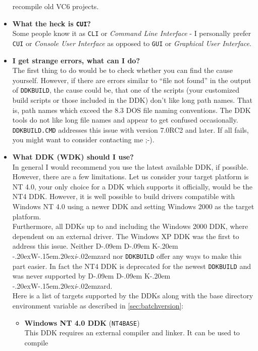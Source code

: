 \documentclass[a4paper,titlepage]{report}
\def\ddkwiz{D\kern-.09em D\kern-.09em K\kern-.20em \raise-.20ex\hbox{W}\kern-.15em\raise.20ex\hbox{\it{i}}\kern-.02em{zard}}
\begin{document}
\begin{itemize}
        recompile old VC6 projects.
  \item \textbf{What the heck is \texttt{CUI}?}\\
        Some people know it as \texttt{CLI} or \emph{Command Line Interface} - I
        personally prefer \texttt{CUI} or \emph{Console User Interface} as opposed
        to \texttt{GUI} or \emph{Graphical User Interface}.
  \item \textbf{I get strange errors, what can I do?}\\
        The first thing to do would be to check whether you can find the cause yourself.
        However, if there are errors similar to ``file not found'' in the output of
        \texttt{DDKBUILD}, the cause could be, that one of the scripts (your customized
        build scripts or those included in the DDK) don't like long path names. That is,
        path names which exceed the 8.3 DOS file naming conventions. The DDK tools do not
        like long file names and appear to get confused occasionally. \texttt{DDKBUILD.CMD}
        addresses this issue with version 7.0RC2 and later. If all fails, you might want to
        consider contacting me \textsf{;-)}.
  \item \textbf{What DDK (WDK) should I use?}\\
        In general I would recommend you use the latest available DDK, if possible. However,
        there are a few limitations. Let us consider your target platform is NT 4.0, your
        only choice for a DDK which supports it officially, would be the NT4 DDK. However,
        it is well possible to build drivers compatible with Windows NT 4.0 using a newer
        DDK and setting Windows 2000 as the target platform.\\
        Furthermore, all DDKs up to and including the Windows 2000 DDK, where dependent
        on an external driver. The Windows XP DDK was the first to address this issue.
        Neither \ddkwiz{} nor \texttt{DDKBUILD} offer any ways to make this part easier.
        In fact the NT4 DDK is deprecated for the newest \texttt{DDKBUILD} and was never
        supported by \ddkwiz{}.\\
        Here is a list of targets supported by the DDKs along with the base directory
        environment variable as described in \autoref{sec:batchversion}:
        \begin{itemize}
          \item
            \textbf{Windows NT 4.0 DDK} (\texttt{NT4BASE})\\
            This DDK requires an external compiler and linker. It can be used to compile

\end{itemize}
\end{itemize}
\end{document}
